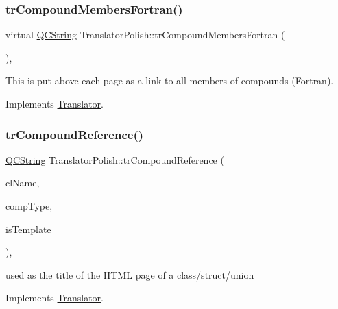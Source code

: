 \subsubsection{\texorpdfstring{trCompoundMembersFortran()}{trCompoundMembersFortran()}}
{\footnotesize\ttfamily virtual \mbox{\hyperlink{class_q_c_string}{Q\+C\+String}} Translator\+Polish\+::tr\+Compound\+Members\+Fortran (\begin{DoxyParamCaption}{ }\end{DoxyParamCaption})\hspace{0.3cm}{\ttfamily [inline]}, {\ttfamily [virtual]}}

This is put above each page as a link to all members of compounds (Fortran). 

Implements \mbox{\hyperlink{class_translator}{Translator}}.

\mbox{\label{class_translator_polish_aa197df64fa1533b150f893d023981675}} 
\subsubsection{\texorpdfstring{trCompoundReference()}{trCompoundReference()}}
{\footnotesize\ttfamily \mbox{\hyperlink{class_q_c_string}{Q\+C\+String}} Translator\+Polish\+::tr\+Compound\+Reference (\begin{DoxyParamCaption}\item[{const char $\ast$}]{cl\+Name,  }\item[{\mbox{\hyperlink{class_class_def_ae70cf86d35fe954a94c566fbcfc87939}{Class\+Def\+::\+Compound\+Type}}}]{comp\+Type,  }\item[{bool}]{is\+Template }\end{DoxyParamCaption})\hspace{0.3cm}{\ttfamily [inline]}, {\ttfamily [virtual]}}

used as the title of the H\+T\+ML page of a class/struct/union 

Implements \mbox{\hyperlink{class_translator}{Translator}}.

\mbox{\label{class_translator_polish_a7113434d4c40967713882a271c0fb478}} 
